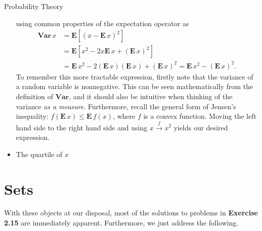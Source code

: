 \begin{chapter}{Probability Theory}
\begin{itemize}
        using common properties of the expectation operator as
        \[\begin{aligned}
            \mathbf{Var}\, x &= \mathbf{E}\left[ (x - \mathbf{E} \, x)^2\right] \\
            &= \mathbf{E}\left[ x^2 - 2 x \mathbf{E}\, x + (\mathbf{E}\, x)^2 \right] \\
            &= \mathbf{E}\, x^2 - 2 (\mathbf{E}\, x)(\mathbf{E}\, x) + (\mathbf{E}\, x)^2 = \mathbf{E}\, x^2 - (\mathbf{E}\, x)^2.
        \end{aligned}\]
        To remember this more tractable expression, firstly note that the variance of a random variable is nonnegative. This can be seen
        mathematically from the definition of $\mathbf{Var}$, and it should also be intuitive when thinking of the variance \textit{as a measure}.
        Furthermore, recall the general form of Jensen's inequality: $f(\mathbf{E}\, x) \le \mathbf{E}\, f(x)$, where $f$ is a convex function. Moving
        the left hand side to the right hand side and using $x \overset{f}{\to} x^2$ yields our desired expression.
        \item The quartile of $x$ 
    \end{itemize}
    
    \section{Sets}

    
    
    
    With these objects at our disposal, most of the solutions to problems in \textbf{Exercise 2.15}
    are immediately apparent. Furthermore, we just address the following.


\end{chapter}
